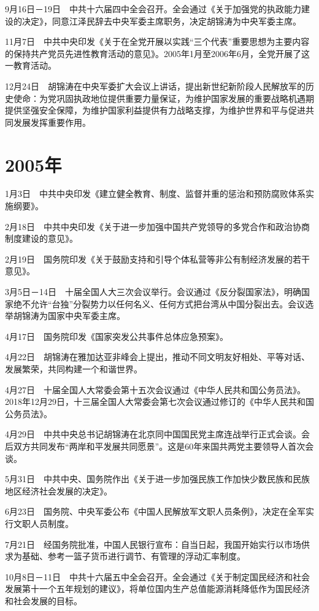 \documentclass[10pt,a4paper,twocolumn]{book}
\begin{document}
9月16日－19日　中共十六届四中全会召开。全会通过《关于加强党的执政能力建设的决定》，同意江泽民辞去中央军委主席职务，决定胡锦涛为中央军委主席。

11月7日　中共中央印发《关于在全党开展以实践“三个代表”重要思想为主要内容的保持共产党员先进性教育活动的意见》。2005年1月至2006年6月，全党开展了这一教育活动。

12月24日　胡锦涛在中央军委扩大会议上讲话，提出新世纪新阶段人民解放军的历史使命：为党巩固执政地位提供重要力量保证，为维护国家发展的重要战略机遇期提供坚强安全保障，为维护国家利益提供有力战略支撑，为维护世界和平与促进共同发展发挥重要作用。

\section{2005年}

1月3日　中共中央印发《建立健全教育、制度、监督并重的惩治和预防腐败体系实施纲要》。

2月18日　中共中央印发《关于进一步加强中国共产党领导的多党合作和政治协商制度建设的意见》。

2月19日　国务院印发《关于鼓励支持和引导个体私营等非公有制经济发展的若干意见》。

3月5日－14日　十届全国人大三次会议举行。会议通过《反分裂国家法》，明确国家绝不允许“台独”分裂势力以任何名义、任何方式把台湾从中国分裂出去。会议选举胡锦涛为国家中央军委主席。

4月17日　国务院印发《国家突发公共事件总体应急预案》。

4月22日　胡锦涛在雅加达亚非峰会上提出，推动不同文明友好相处、平等对话、发展繁荣，共同构建一个和谐世界。

4月27日　十届全国人大常委会第十五次会议通过《中华人民共和国公务员法》。2018年12月29日，十三届全国人大常委会第七次会议通过修订的《中华人民共和国公务员法》。

4月29日　中共中央总书记胡锦涛在北京同中国国民党主席连战举行正式会谈。会后双方共同发布“两岸和平发展共同愿景”。这是60年来国共两党主要领导人首次会谈。

5月31日　中共中央、国务院作出《关于进一步加强民族工作加快少数民族和民族地区经济社会发展的决定》。

6月23日　国务院、中央军委公布《中国人民解放军文职人员条例》，决定在全军实行文职人员制度。

7月21日　经国务院批准，中国人民银行宣布：自当日起，我国开始实行以市场供求为基础、参考一篮子货币进行调节、有管理的浮动汇率制度。

10月8日－11日　中共十六届五中全会召开。全会通过《关于制定国民经济和社会发展第十一个五年规划的建议》，将单位国内生产总值能源消耗降低作为国民经济和社会发展的目标。
\end{document}
